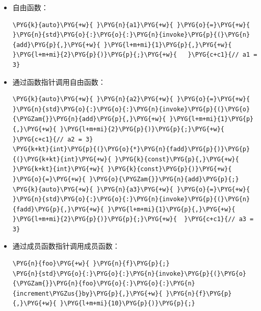 \begin{itemize}
\item 自由函数：



\begin{codeblockbg}
\begin{Verbatim}[commandchars=\\\{\},breaklines=true,breakanywhere=true,fontsize=\codefont,xleftmargin=17bp]
\PYG{k}{auto}\PYG{+w}{ }\PYG{n}{a1}\PYG{+w}{ }\PYG{o}{=}\PYG{+w}{ }\PYG{n}{std}\PYG{o}{:}\PYG{o}{:}\PYG{n}{invoke}\PYG{p}{(}\PYG{n}{add}\PYG{p}{,}\PYG{+w}{ }\PYG{l+m+mi}{1}\PYG{p}{,}\PYG{+w}{ }\PYG{l+m+mi}{2}\PYG{p}{)}\PYG{p}{;}\PYG{+w}{   }\PYG{c+c1}{// a1 = 3}
\end{Verbatim}
\end{codeblockbg}



\item 通过函数指针调用自由函数：



\begin{codeblockbg}
\begin{Verbatim}[commandchars=\\\{\},breaklines=true,breakanywhere=true,fontsize=\codefont,xleftmargin=17bp]
\PYG{k}{auto}\PYG{+w}{ }\PYG{n}{a2}\PYG{+w}{ }\PYG{o}{=}\PYG{+w}{ }\PYG{n}{std}\PYG{o}{:}\PYG{o}{:}\PYG{n}{invoke}\PYG{p}{(}\PYG{o}{\PYGZam{}}\PYG{n}{add}\PYG{p}{,}\PYG{+w}{ }\PYG{l+m+mi}{1}\PYG{p}{,}\PYG{+w}{ }\PYG{l+m+mi}{2}\PYG{p}{)}\PYG{p}{;}\PYG{+w}{  }\PYG{c+c1}{// a2 = 3}
\PYG{k+kt}{int}\PYG{p}{(}\PYG{o}{*}\PYG{n}{fadd}\PYG{p}{)}\PYG{p}{(}\PYG{k+kt}{int}\PYG{+w}{ }\PYG{k}{const}\PYG{p}{,}\PYG{+w}{ }\PYG{k+kt}{int}\PYG{+w}{ }\PYG{k}{const}\PYG{p}{)}\PYG{+w}{ }\PYG{o}{=}\PYG{+w}{ }\PYG{o}{\PYGZam{}}\PYG{n}{add}\PYG{p}{;}
\PYG{k}{auto}\PYG{+w}{ }\PYG{n}{a3}\PYG{+w}{ }\PYG{o}{=}\PYG{+w}{ }\PYG{n}{std}\PYG{o}{:}\PYG{o}{:}\PYG{n}{invoke}\PYG{p}{(}\PYG{n}{fadd}\PYG{p}{,}\PYG{+w}{ }\PYG{l+m+mi}{1}\PYG{p}{,}\PYG{+w}{ }\PYG{l+m+mi}{2}\PYG{p}{)}\PYG{p}{;}\PYG{+w}{  }\PYG{c+c1}{// a3 = 3}
\end{Verbatim}
\end{codeblockbg}



\item 通过成员函数指针调用成员函数：



\begin{codeblockbg}
\begin{Verbatim}[commandchars=\\\{\},breaklines=true,breakanywhere=true,fontsize=\codefont,xleftmargin=17bp]
\PYG{n}{foo}\PYG{+w}{ }\PYG{n}{f}\PYG{p}{;}
\PYG{n}{std}\PYG{o}{:}\PYG{o}{:}\PYG{n}{invoke}\PYG{p}{(}\PYG{o}{\PYGZam{}}\PYG{n}{foo}\PYG{o}{:}\PYG{o}{:}\PYG{n}{increment\PYGZus{}by}\PYG{p}{,}\PYG{+w}{ }\PYG{n}{f}\PYG{p}{,}\PYG{+w}{ }\PYG{l+m+mi}{10}\PYG{p}{)}\PYG{p}{;}
\end{Verbatim}
\end{codeblockbg}



\end{itemize}
